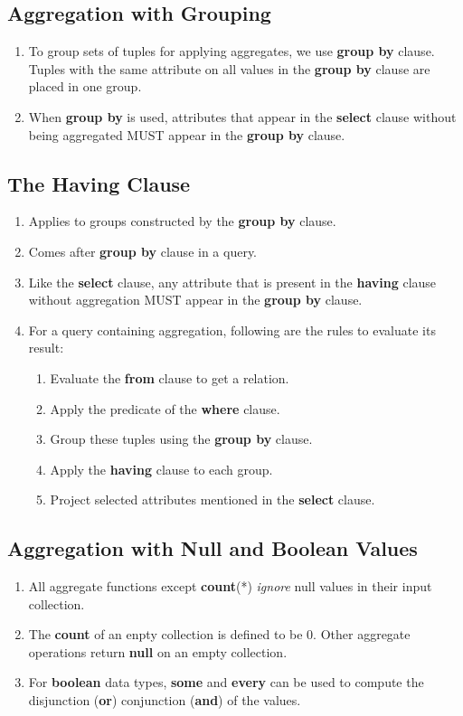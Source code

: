 \documentclass[journal,12pt,twocolumn]{IEEEtran}
\begin{document}
\subsection{Aggregation with Grouping}
\begin{enumerate}
    \item To group sets of tuples for applying aggregates, we use 
    \textbf{group by} clause. Tuples with the same attribute on all values in 
    the \textbf{group by} clause are placed in one group.
    \item When \textbf{group by} is used, attributes that appear in the 
    \textbf{select} clause without being aggregated MUST appear in the 
    \textbf{group by} clause.
\end{enumerate}

\subsection{The Having Clause}
\begin{enumerate}
    \item Applies to groups constructed by the \textbf{group by} clause.
    \item Comes after \textbf{group by} clause in a query.
    \item Like the \textbf{select} clause, any attribute that is present in the 
    \textbf{having} clause without aggregation MUST appear in the 
    \textbf{group by} clause.
    \item For a query containing aggregation, following are the rules to 
    evaluate its result:
    \begin{enumerate}
        \item Evaluate the \textbf{from} clause to get a relation.
        \item Apply the predicate of the \textbf{where} clause.
        \item Group these tuples using the \textbf{group by} clause.
        \item Apply the \textbf{having} clause to each group.
        \item Project selected attributes mentioned in the \textbf{select} clause.
    \end{enumerate}
\end{enumerate}

\subsection{Aggregation with Null and Boolean Values}
\begin{enumerate}
    \item All aggregate functions except \textbf{count}(*) \textit{ignore} null 
    values in their input collection.
    \item The \textbf{count} of an enpty collection is defined to be 0. Other 
    aggregate operations return \textbf{null} on an empty collection.
    \item For \textbf{boolean} data types, \textbf{some} and \textbf{every} 
    can be used to compute the disjunction (\textbf{or}) conjunction 
    (\textbf{and}) of the values.
\end{enumerate}
\end{document}

